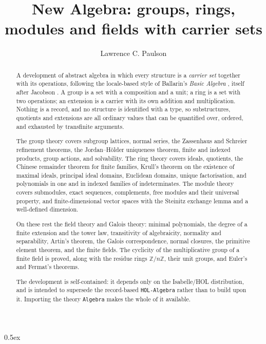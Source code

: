\documentclass{article}
\begin{document}
\title{New Algebra: groups, rings, modules and fields with carrier sets}
\author{Lawrence C. Paulson}
\date{}

\maketitle

\begin{abstract}
  A development of abstract algebra in which every structure is a \emph{carrier
  set} together with its operations, following the locale-based style of
  Ballarin's \emph{Basic Algebra} \cite{ballarin-jacobson}, itself after
  Jacobson \cite{jacobson-basic-algebra}.  A group is a set with a composition
  and a unit; a ring is a set with two operations; an extension is a carrier with
  its own addition and multiplication.  Nothing is a record, and no structure is
  identified with a type, so substructures, quotients and extensions are all
  ordinary values that can be quantified over, ordered, and exhausted by
  transfinite arguments.

  The group theory covers subgroup lattices, normal series, the Zassenhaus and
  Schreier refinement theorems, the Jordan--H\"older uniqueness theorem, finite
  and indexed products, group actions, and solvability.  The ring theory covers
  ideals, quotients, the Chinese remainder theorem for finite families, Krull's
  theorem on the existence of maximal ideals, principal ideal domains, Euclidean
  domains, unique factorisation, and polynomials in one and in indexed families
  of indeterminates.  The module theory covers submodules, exact sequences,
  complements, free modules and their universal property, and finite-dimensional
  vector spaces with the Steinitz exchange lemma and a well-defined dimension.

  On these rest the field theory and Galois theory: minimal polynomials, the
  degree of a finite extension and the tower law, transitivity of algebraicity,
  normality and separability, Artin's theorem, the Galois correspondence, normal
  closures, the primitive element theorem, and the finite fields.  The
  cyclicity of the multiplicative group of a finite field is proved, along with
  the residue rings $\mathbb{Z}/n\mathbb{Z}$, their unit groups, and Euler's and
  Fermat's theorems.

  The development is self-contained: it depends only on the Isabelle/HOL
  distribution, and is intended to supersede the record-based \texttt{HOL-Algebra}
  rather than to build upon it.  Importing the theory \texttt{Algebra} makes the
  whole of it available.
\end{abstract}

\parindent 0pt\parskip 0.5ex

\pagestyle{plain}

\tableofcontents
\newpage





\end{document}
